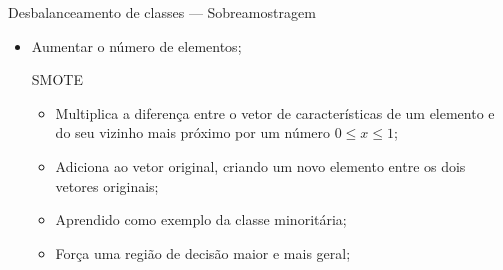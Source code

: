 \documentclass{beamer}
\begin{document}
\begin{frame}{Desbalanceamento de classes --- Sobreamostragem}
  \setlength\leftmargini{1em}
  \justifying
  \begin{itemize}
    \item Aumentar o número de elementos;
    \begin{block}{SMOTE}
      \setlength\leftmargini{1em}
      \begin{itemize}
        \item Multiplica a diferença entre o vetor de características de um elemento e do seu vizinho mais próximo por um número $0 \leq x \leq 1$;
        \item Adiciona ao vetor original, criando um novo elemento entre os dois vetores originais;
        \item Aprendido como exemplo da classe minoritária;
        \item Força uma região de decisão maior e mais geral;
      \end{itemize}
    \end{block}
  \end{itemize}
\end{frame}
%
\end{document}
